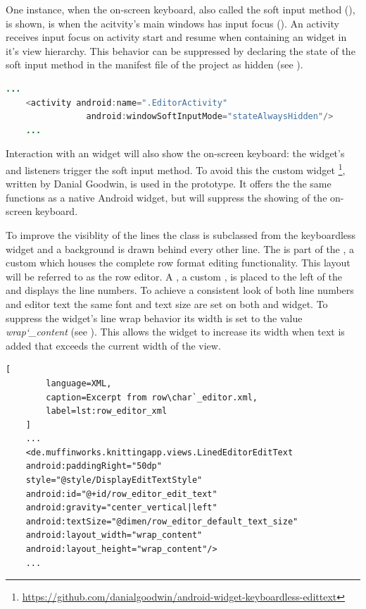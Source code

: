 One instance, when the on-screen keyboard, also called the soft input method (\cite{android_softinputmethod}), is shown, is when the acitvity's main windows has input focus (\cite{android_windowsoftinputmode_docs}). An activity receives input focus on activity start and resume when containing an  widget in it's view hierarchy. This behavior can be suppressed by declaring the state of the soft input method in the manifest file of the project as hidden (see ).

\begin{lstlisting}[language=JAVA, caption=Declaring on-screen keyboard hidden in manifest file., label=lst:inputstate_hidden_manifest]
	...
	<activity android:name=".EditorActivity"
	            android:windowSoftInputMode="stateAlwaysHidden"/>
	...
\end{lstlisting}

Interaction with an  widget will also show the on-screen keyboard: the widget's  and  listeners trigger the soft input method. To avoid this the custom widget \footnote{\url{https://github.com/danialgoodwin/android-widget-keyboardless-edittext}}, written by Danial Goodwin, is used in the prototype. It offers the the same functions as a native Android  widget, but will suppress the showing of the on-screen keyboard.

To improve the visiblity of the lines the  class is subclassed from the keyboardless  widget and a background is drawn behind every other line. The  is part of the , a custom  which houses the complete row format editing functionality. This layout will be referred to as the row editor. A , a custom , is placed to the left of the  and displays the line numbers. To achieve a consistent look of both line numbers and editor text the same font and text size are set on both  and  widget.
To suppress the  widget's line wrap behavior its width is set to the value \textit{wrap\char`_content} (see ). This allows the widget to increase its width when text is added that exceeds the current width of the view.

\begin{lstlisting}[
		language=XML, 
		caption=Excerpt from row\char`_editor.xml, 
		label=lst:row_editor_xml
	]
	...
    <de.muffinworks.knittingapp.views.LinedEditorEditText
    android:paddingRight="50dp"
    style="@style/DisplayEditTextStyle"
    android:id="@+id/row_editor_edit_text"
    android:gravity="center_vertical|left"
    android:textSize="@dimen/row_editor_default_text_size"
    android:layout_width="wrap_content"
    android:layout_height="wrap_content"/>
	...
\end{lstlisting}

